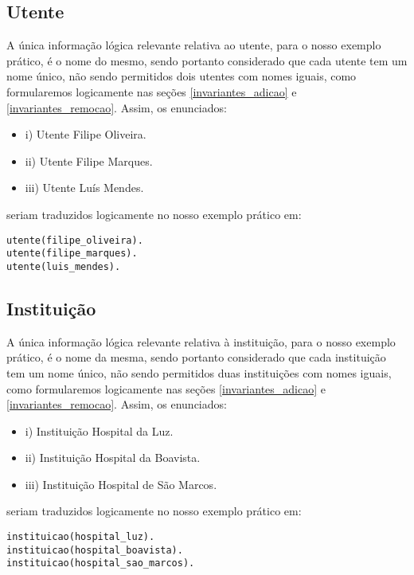 \documentclass[
  oneside,
  10pt, a4paper,
  footinclude=true,
  headinclude=true,
  cleardoublepage=empty
]{scrbook}
\begin{document}
        \subsection{Utente}
        A única informação lógica relevante relativa ao utente, para o nosso exemplo prático, é o nome do mesmo, sendo portanto considerado que cada utente tem um nome único, não sendo permitidos dois utentes com nomes iguais, como formularemos logicamente nas seções \ref{invariantes_adicao} e \ref{invariantes_remocao}.
        Assim, os enunciados:
\begin{itemize}
\item i) Utente Filipe Oliveira.
\item ii) Utente Filipe Marques.
\item iii) Utente Luís Mendes.
\end{itemize}
seriam traduzidos logicamente  no nosso exemplo prático em:
\begin{lstlisting}
utente(filipe_oliveira).
utente(filipe_marques).
utente(luis_mendes).
\end{lstlisting}

        \subsection{Instituição}
  A única informação lógica relevante relativa à instituição, para o nosso exemplo prático, é o nome da mesma, sendo portanto considerado que cada instituição tem um nome único, não sendo permitidos duas instituições com nomes iguais, como formularemos logicamente nas seções \ref{invariantes_adicao} e \ref{invariantes_remocao}.
        Assim, os enunciados:
\begin{itemize}
\item i) Instituição Hospital da Luz.
\item ii) Instituição Hospital da Boavista.
\item iii) Instituição Hospital de São Marcos.
\end{itemize}
seriam traduzidos logicamente  no nosso exemplo prático em:
\begin{lstlisting}
instituicao(hospital_luz).
instituicao(hospital_boavista).
instituicao(hospital_sao_marcos).
\end{lstlisting}
        
\end{document}
